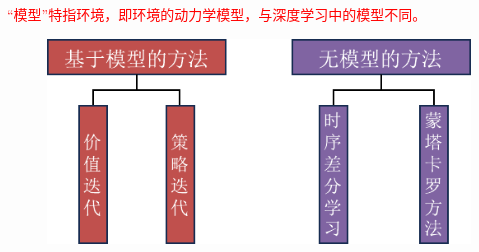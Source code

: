 \textcolor{red}{“模型”特指环境，即环境的动力学模型，与深度学习中的模型不同。}
\begin{figure}[htbp]
    \centering
    \includegraphics{image/典型强化学习算法.pdf}
\end{figure}
